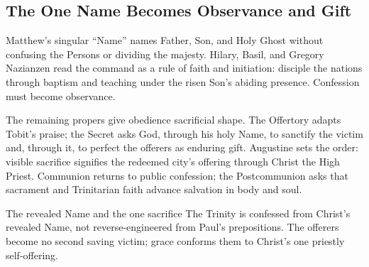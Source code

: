 \sectionguard
\subsection*{The One Name Becomes Observance and Gift\enspace{}}

Matthew's singular ``Name'' names Father, Son, and Holy Ghost without confusing the Persons or dividing the majesty. Hilary, Basil, and Gregory Nazianzen read the command as a rule of faith and initiation: disciple the nations through baptism and teaching under the risen Son's abiding presence. Confession must become observance.

The remaining propers give obedience sacrificial shape. The Offertory adapts Tobit's praise; the Secret asks God, through his holy Name, to sanctify the victim and, through it, to perfect the offerers as enduring gift. Augustine sets the order: visible sacrifice signifies the redeemed city's offering through Christ the High Priest. Communion returns to public confession; the Postcommunion asks that sacrament and Trinitarian faith advance salvation in body and soul.

\begin{studybox}{The revealed Name and the one sacrifice}
The Trinity is confessed from Christ's revealed Name, not reverse-engineered from Paul's prepositions. The offerers become no second saving victim; grace conforms them to Christ's one priestly self-offering.
\end{studybox}
